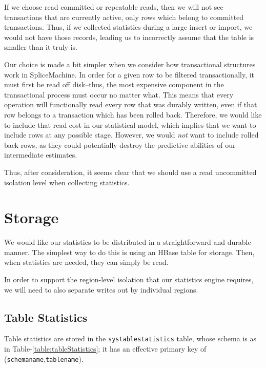 If we choose read committed or repeatable reads, then we will not see transactions that are currently active, only rows which belong to committed transactions. Thus, if we collected statistics during a large insert or import, we would not have those records, leading us to incorrectly assume that the table is smaller than it truly is.

Our choice is made a bit simpler when we consider how transactional structures work in SpliceMachine. In order for a given row to be filtered transactionally, it must first be read off disk--thus, the most expensive component in the transactional process must occur no matter what. This means that every operation will functionally read every row that was durably written, even if that row belongs to a transaction which has been rolled back. Therefore, we would like to include that read cost in our statistical model, which implies that we want to include rows at any possible stage. However, we would \emph{not} want to include rolled back rows, as they could potentially destroy the predictive abilities of our intermediate estimates. 

Thus, after consideration, it seems clear that we should use a read uncommitted isolation level when collecting statistics.

\section{Storage}
\label{sec:Storage}
We would like our statistics to be distributed in a straightforward and durable manner. The simplest way to do this is using an HBase table for storage. Then, when statistics are needed, they can simply be read.

In order to support the region-level isolation that our statistics engine requires, we will need to also separate writes out by individual regions. 

\subsection{Table Statistics}
Table statistics are stored in the \texttt{systablestatistics} table, whose schema is as in Table-\ref{table:tableStatistics}; it has an effective primary key of (\texttt{schemaname},\texttt{tablename}).

